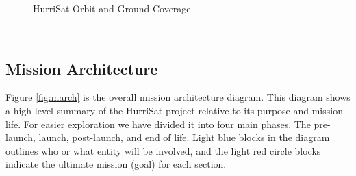 \begin{figure}[hbt!]
    \centering
    \hspace{2mm}
    \caption{HurriSat Orbit and Ground Coverage}
    \label{fig:orbiGC}
\end{figure}
\\
\FloatBarrier
\subsection{Mission Architecture}
Figure \ref{fig:march} is the overall mission architecture diagram. This diagram shows a high-level summary of the HurriSat project relative to its purpose and mission life. For easier exploration we have divided it into four main phases. The pre-launch, launch, post-launch, and end of life. Light blue blocks in the diagram outlines who or what entity will be involved, and the light red circle blocks indicate the ultimate mission (goal) for each section. \\

